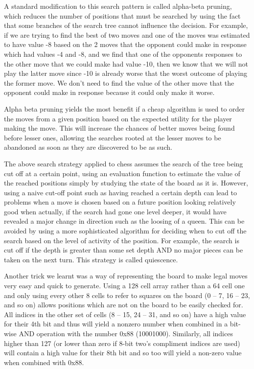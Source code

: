 \documentclass{l3proj}
\begin{document}
A standard modification to this search pattern is called alpha-beta pruning, which reduces
the number of positions that must be searched by using the fact that some branches of the
search tree cannot influence the decision. For example, if we are trying to find the best of
two moves and one of the moves was estimated to have value -8 based on the 2 moves
that the opponent could make in response which had values -4 and -8, and we find that
one of the opponents responses to the other move that we could make had value -10, then
we know that we will not play the latter move since -10 is already worse that the worst
outcome of playing the former move. We don’t need to find the value of the other move
that the opponent could make in response because it could only make it worse.

Alpha beta pruning yields the most benefit if a cheap algorithm is used to order the moves
from a given position based on the expected utility for the player making the move. This
will increase the chances of better moves being found before lesser ones, allowing the
searches rooted at the lesser moves to be abandoned as soon as they are discovered to be
as such.

The above search strategy applied to chess assumes the search of the tree being cut off at
a certain point, using an evaluation function to estimate the value of the reached positions
simply by studying the state of the board as it is. However, using a naive cut-off point such
as having reached a certain depth can lead to problems when a move is chosen based on
a future position looking relatively good when actually, if the search had gone one level
deeper, it would have revealed a major change in direction such as the loosing of a queen.
This can be avoided by using a more sophisticated algorithm for deciding when to cut off
the search based on the level of activity of the position. For example, the search is cut off
if the depth is greater than some set depth AND no major pieces can be taken on the next
turn. This strategy is called quiescence.

Another trick we learnt was a way of representing the board to make legal moves very
easy and quick to generate. Using a 128 cell array rather than a 64 cell one and only using
every other 8 cells to refer to squares on the board (0 – 7, 16 – 23, and so on) allows
positions which are not on the board to be easily checked for. All indices in the other set of
cells (8 – 15, 24 – 31, and so on) have a high value for their 4th bit and thus will yield a nonzero
number when combined in a bit-wise AND operation with the number 0x88
(10001000). Similarly, all indices higher than 127 (or lower than zero if 8-bit two’s
compliment indices are used) will contain a high value for their 8th bit and so too will yield
a non-zero value when combined with 0x88.
\end{document}
